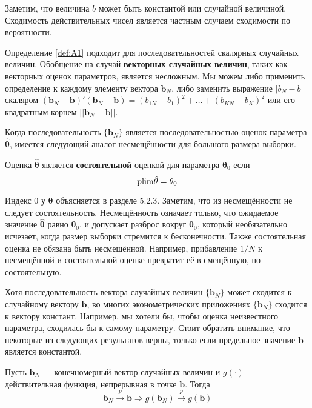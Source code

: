 Заметим, что величина $b$ может быть константой или случайной величиной. Сходимость действительных чисел является частным случаем сходимости по вероятности.

Определение \ref{def:A1} подходит для последовательностей скалярных случайных величин. Обобщение на случай \textbf{векторных случайных величин}, таких как векторных оценок параметров, является несложным. Мы можем либо применить определение к каждому элементу вектора $\mathbf{b}_N$, либо заменить выражение $|b_N-b|$ скаляром $(\mathbf{b}_N-\mathbf{b})'(\mathbf{b}_N-\mathbf{b})=(b_{1N}-b_1)^2+\ldots+(b_{KN}-b_K)^2$ или его квадратным корнем $||\mathbf{b}_N-\mathbf{b}||$. 

Когда последовательность $\{\mathbf{b}_N\}$ является последовательностью оценок параметра $\hat{\mathbf{\theta}}$, имеется следующий аналог несмещённости для большого размера выборки.

\begin{definition}[Состоятельность]
Оценка $\hat{\mathbf{\theta}}$ является \textbf{состоятельной} оценкой для параметра $\mathbf{\theta}_0$ если 
\begin{equation}
\mathrm{plim } \hat{\mathbf{\theta}} = \mathbf{\theta}_0
\end{equation}
\end{definition}

Индекс 0 у $\mathbf{\theta}$ объясняется в разделе 5.2.3. Заметим, что из несмещённости не следует состоятельность. Несмещённость означает только, что ожидаемое значение $\hat{\mathbf{\theta}}$ равно $\mathbf{\theta}_0$, и допускает разброс вокруг $\mathbf{\theta}_0$, который необязательно исчезает, когда размер выборки стремится к бесконечности. Также состоятельная оценка не обязана быть несмещённой. Например, прибавление $1/N$ к несмещённой и состоятельной оценке превратит её в смещённую, но состоятельную.

Хотя последовательность вектора случайных величин $\{\mathbf{b}_N\}$ может сходится к случайному вектору $\mathbf{b}$, во многих эконометрических приложениях $\{\mathbf{b}_N\}$ сходится к вектору констант. Например, мы хотели бы, чтобы оценка неизвестного параметра, сходилась бы к самому параметру. Стоит обратить внимание, что некоторые из следующих результатов верны, только если предельное значение $\mathbf{b}$ является константой.

\begin{theorem}
\label{th:A3}
Пусть $\mathbf{b}_N$ --- конечномерный вектор случайных величин и $g(\cdot)$ --- действительная функция, непрерывная в точке $\mathbf{b}$. Тогда
\begin{equation}
\mathbf{b}_N\overset{p}{\to}\mathbf{b} \Rightarrow g(\mathbf{b}_N)\overset{p}{\to}g(\mathbf{b})
\end{equation}
\end{theorem}


